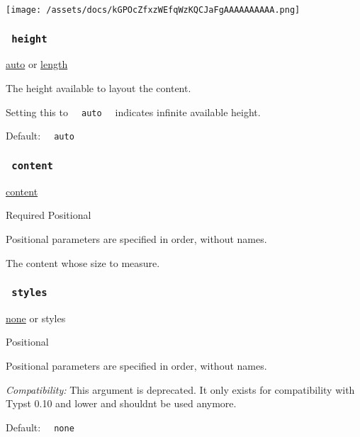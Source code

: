 \texttt{[image: /assets/docs/kGPOcZfxzWEfqWzKQCJaFgAAAAAAAAAA.png]}

\subsubsection{\texorpdfstring{\texttt{\ height\ }}{ height }}\label{parameters-height}

\href{/docs/reference/foundations/auto/}{auto} {or}
\href{/docs/reference/layout/length/}{length}

The height available to layout the content.

Setting this to \texttt{\ }{\texttt{\ auto\ }}\texttt{\ } indicates
infinite available height.

Default: \texttt{\ }{\texttt{\ auto\ }}\texttt{\ }

\subsubsection{\texorpdfstring{\texttt{\ content\ }}{ content }}\label{parameters-content}

\href{/docs/reference/foundations/content/}{content}

{Required} {{ Positional }}

\label{parameters-content-positional-tooltip}
Positional parameters are specified in order, without names.

The content whose size to measure.

\subsubsection{\texorpdfstring{\texttt{\ styles\ }}{ styles }}\label{parameters-styles}

\href{/docs/reference/foundations/none/}{none} {or} { styles }

{{ Positional }}

\label{parameters-styles-positional-tooltip}
Positional parameters are specified in order, without names.

\emph{Compatibility:} This argument is deprecated. It only exists for
compatibility with Typst 0.10 and lower and shouldn\textquotesingle t be
used anymore.

Default: \texttt{\ }{\texttt{\ none\ }}\texttt{\ }

\href{/docs/reference/layout/length/}{\pandocbounded{}}


